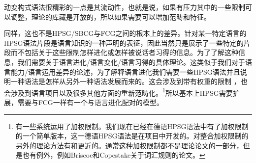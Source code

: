 

动变构式语法很精彩的一点是其流动性，也就是说，如果有压力其中的一些限制可以调整，理论的库藏是开放的，所以如果需要可以增加范畴和特征。

同样，这也不是HPSG/SBCG与FCG之间的根本上的差异。针对某一特定语言的HPSG语法片段是语言知识的一种声明的表征，因此当然只是展示了一些特定的片段而不包括关于这些限制怎样进化或怎样被说话者习得的信息。为了了解这种信息，我们需要关于语言进化/语言变化/语言习得的具体理论。这类似于我们对于语言能力/语言运用差异的论述，为了解释语言进化我们需要一些HPSG语法并且说明一种语法是怎样从另外一种语法发展而来的。这会涉及到带有权重的限制 ，也会涉及到语言项目以及很多其他方面的重新范畴化。\footnote{
有一些系统运用了加权限制。我们现在已经在德语HPSG语法中有了加权限制的一个简单版本，这一德语HPSG语法是在\verbmobil 项目中开发的\citep{MK2000a}。对整合加权限制的另外的理论方法有和更近的。通常这种加权限制都不是理论论文的一部分，但是也有例外，例如Briscoe和Copestake关于词汇规则的论文\citep{BC99a}。  
}所以基本上HPSG需要扩展，需要与FCG一样有一个与语言进化配对的模型。

